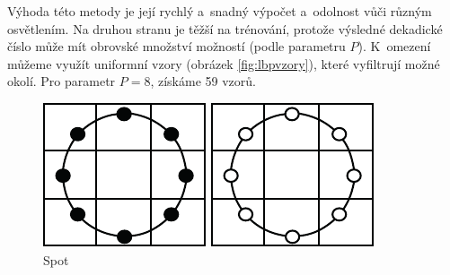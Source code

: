Výhoda této metody je její rychlý a~snadný výpočet a~odolnost vůči různým osvětlením. Na druhou stranu je těžší na trénování, protože výsledné dekadické číslo může mít obrovské množství možností (podle parametru $P$). K~omezení můžeme využít uniformní vzory (obrázek \ref{fig:lbpvzory}), které vyfiltrují možné okolí. Pro parametr $P=8$, získáme 59 vzorů. 

\begin{figure}[H]
\centering
\begin{minipage}[b]{.18\textwidth}
  \centering
  \includegraphics[width=.9\linewidth]{figures/lbp_spot}
  \caption*{Spot}
\end{minipage}
\begin{minipage}[b]{.18\textwidth}
  \centering
  \includegraphics[width=.9\linewidth]{figures/lbp_spot_flat}

\end{minipage}
\end{figure}
